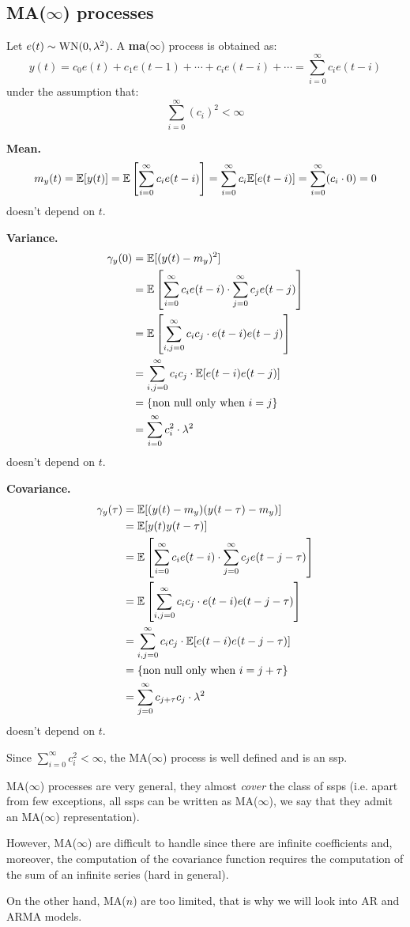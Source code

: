 \subsection{MA(\texorpdfstring{$\infty$}{infinity}) processes}

\begin{defn}
	Let $e(t) \sim \operatorname{WN}(0, \lambda^{2})$. A \textbf{\gls{ma}}($\infty$) process is obtained as:
	\[
		\boxed{y(t)=c_{0} e(t)+c_{1} e(t-1)+\cdots+c_{i} e(t-i)+\cdots=\sum_{i=0}^{\infty} c_{i} e(t-i)}
	\]
	under the assumption that:
	\[
		\sum_{i=0}^{\infty} (c_{i})^{2}<\infty
	\]
\end{defn}

\textbf{Mean.}
\[
	m_{y}(t)=\mathbb{E}[y(t)]=\mathbb{E}\left[\sum_{i=0}^{\infty} c_{i} e(t-i)\right]=\sum_{i=0}^{\infty} c_{i} \mathbb{E}[e(t-i)]=\sum_{i=0}^{\infty} (c_{i} \cdot 0) =0
\]
doesn't depend on $t$.

\textbf{Variance.}
\begin{align*}
	\gamma_{y}(0)&=\mathbb{E}[(y(t)-m_{y})^{2}]\\
	&=\mathbb{E}\left[\sum_{i=0}^{\infty} c_{i} e(t-i) \cdot \sum_{j=0}^{\infty} c_{j} e(t-j)\right]\\
	&=\mathbb{E}\left[\sum_{i, j=0}^{\infty} c_{i} c_{j} \cdot e(t-i) e(t-j)\right]\\
	&=\sum_{i, j=0}^{\infty} c_{i} c_{j} \cdot \mathbb{E}[e(t-i) e(t-j)]\\
	&=\{\text{non null only when }i=j\}\\
	&=\sum_{i=0}^{\infty} c_{i}^2 \cdot\lambda^2 
\end{align*}
doesn't depend on $t$.

\textbf{Covariance.}
\begin{align*}
	\gamma_{y}(\tau) &=\mathbb{E}[(y(t)-m_{y}) (y(t-\tau)-m_{y})]\\
	&=\mathbb{E}[y(t) y(t-\tau)]\\
	&=\mathbb{E}\left[\sum_{i=0}^{\infty} c_{i} e(t-i) \cdot \sum_{j=0}^{\infty} c_{j} e(t-j-\tau)\right]\\
	&=\mathbb{E}\left[\sum_{i, j=0}^{\infty} c_{i} c_{j} \cdot e(t-i) e(t-j-\tau)\right]\\
	&=\sum_{i, j=0}^{\infty} c_{i} c_{j} \cdot \mathbb{E}[e(t-i) e(t-j-\tau)]\\
	&=\{\text{non null only when }i=j+\tau\}\\
	&=\sum_{j=0}^{\infty} c_{j+\tau}c_{j}\cdot\lambda^2 
\end{align*}
doesn't depend on $t$.

Since $\sum_{i=0}^{\infty} c_{i}^{2}<\infty$, the MA($\infty $) process is well defined and is an \gls{ssp}.

\begin{rem}
MA($\infty$) processes are very general, they almost \emph{cover} the class of \glspl{ssp} (i.e. apart from few exceptions, all \glspl{ssp} can be written as MA($\infty$), we say that they admit an MA($\infty$) representation).

However, MA($\infty$) are difficult to handle since there are infinite coefficients and, moreover, the computation of the covariance function requires the computation of the sum of an infinite series (hard in general).

On the other hand, MA($n$) are too limited, that is why we will look into AR and ARMA models.
\end{rem}